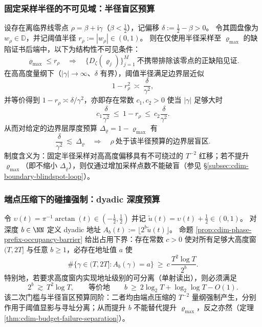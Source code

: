 \subsubsection{固定采样半径的不可见域：半径盲区预算}\label{subsubsec:cdim-blindspot-budget-radius}
设存在离临界线零点 \(\rho=\beta+\mathrm{i}\gamma\)（\(\beta<\tfrac12\)），记偏移 \(\delta:=\tfrac12-\beta>0\)。
令其圆盘像为 \(w_\rho\in\mathbb{D}\)，并记阈值半径 \(r_\rho:=|w_\rho|\in(0,1)\)。
则在仅使用半径采样至 \(\varrho_{\max}\) 的缺陷证书后端中，以下为结构性不可见条件：
\[
\varrho_{\max}\le r_\rho
\quad\Longrightarrow\quad
\{D_{\zeta}(\varrho_j)\}_{j=1}^{M}\ \text{不携带排除该零点的正缺陷见证}.
\]
在高高度量纲下（\(|\gamma|\to\infty\)、\(\delta\) 有界），阈值半径满足边界层近似
\[
1-r_\rho^2\ \asymp\ \frac{\delta}{\gamma^2},
\]
并等价得到 \(1-r_\rho\asymp \delta/\gamma^2\)，亦即存在常数 \(c_1,c_2>0\) 使当 \(|\gamma|\) 足够大时
\[
c_1\frac{\delta}{\gamma^2}\ \le\ 1-r_\rho\ \le\ c_2\frac{\delta}{\gamma^2}.
\]
从而对给定的边界层厚度预算 \(\Delta_{\varrho}=1-\varrho_{\max}\) 有
\[
\frac{\delta}{\gamma^2}\ \lesssim\ \Delta_{\varrho}
\quad\Longrightarrow\quad
\rho\ \text{处于该半径预算的边界层盲区}.
\]
制度含义为：固定半径采样对高高度偏移具有不可绕过的 \(T^{-2}\) 红移；若不提升 \(\varrho_{\max}\)（即不缩小 \(\Delta_\varrho\)），则仅通过增加采样点数不能破盲（参见 \S\ref{subsec:cdim-boundary-blindspot-loop}）。

\subsubsection{端点压缩下的碰撞强制：dyadic 深度预算}\label{subsubsec:cdim-blindspot-budget-dyadic}
令 \(\upsilon(t)=\pi^{-1}\arctan(t)\in(-\tfrac12,\tfrac12)\) 并记 \(\widetilde u(t)=\upsilon(t)+\tfrac12\in(0,1)\)。
对深度 \(b\in\NN\) 定义 dyadic 地址
\(
A_b(t):=\lfloor 2^b\widetilde u(t)\rfloor
\)。
命题 \ref{prop:cdim-phase-prefix-occupancy-barrier} 给出占用下界：存在常数 \(c>0\) 使对所有足够大高度窗 \((T,2T]\) 与任意 \(b\ge 1\)，必存在地址值 \(a\) 使
\[
\#\{\gamma\in(T,2T]:A_b(\gamma)=a\}\ \ge\ c\,\frac{T^2\log T}{2^b}.
\]
特别地，若要求高度窗内实现地址级别的可分离（单射读出），则必须满足
\[
2^b\ \gtrsim\ T^2\log T,
\qquad\text{等价地}\qquad
b\ \ge\ 2\log_2T+\log_2\log T-O(1).
\]
该二次门槛与半径盲区预算同阶：二者均由端点压缩的 \(T^{-2}\) 量纲强制产生，分别作用于阈值显影与寻址分离；从而提升 \(b\) 不能替代提升 \(\varrho_{\max}\)，反之亦然（定理 \ref{thm:cdim-budget-failure-separation}）。

